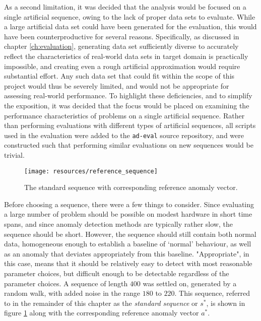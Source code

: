 As a second limitation, it was decided that the analysis would be focused on a single artificial sequence, owing to the lack of proper data sets to evaluate.
While a large artificial data set could have been generated for the evaluation, this would have been counterproductive for several reasons.
Specifically, as discussed in chapter \ref{ch:evaluation}, generating data set sufficiently diverse to accurately reflect the characteristics of real-world data sets in target domain is practically impossible, and creating even a rough artificial approximation would require substantial effort.
Any such data set that could fit within the scope of this project would thus be severely limited, and would not be appropriate for assessing real-world performance.
To highlight these deficiencies, and to simplify the exposition, it was decided that the focus would be placed on examining the performance characteristics of problems on a single artificial sequence.
Rather than performing evaluations with different types of artificial sequences, all scripts used in the evaluation were added to the \texttt{ad-eval} source repository, and were constructed such that performing similar evaluations on new sequences would be trivial.

\begin{figure}[h]
    \vspace{-10pt}
    \begin{center}
        \texttt{[image: resources/reference\_sequence]}
    \end{center}
    \vspace{-20pt}
    \caption{\small{The standard sequence with corresponding reference anomaly vector.}}
    \label{fig:reference_sequence}
    \vspace{-10pt}
\end{figure}

Before choosing a sequence, there were a few things to consider. Since evaluating a large number of problem should be possible on modest hardware in short time spans, and since anomaly detection methods are typically rather slow, the sequence should be short. However, the sequence should still contain both normal data, homogeneous enough to establish a baseline of `normal' behaviour, as well as an anomaly that deviates appropriately from this baseline. "Appropriate", in this case, means that it should be relatively easy to detect with most reasonable parameter choices, but difficult enough to be detectable regardless of the parameter choices. A sequence of length $400$ was settled on, generated by a random walk, with added noise in the range $180$ to $220$. This sequence, referred to in the remainder of this chapter as the \emph{standard sequence} or $s^*$, is shown in figure \ref{fig:reference_sequence} along with the corresponding reference anomaly vector $a^*$.

